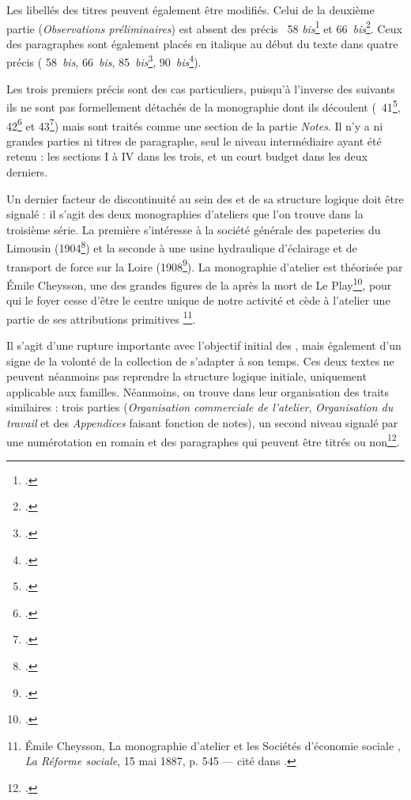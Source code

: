 Les libellés des titres peuvent également être modifiés. Celui de la deuxième partie (\textit{Observations préliminaires}) est absent des précis \no{}~58 \textit{bis}\footcite[p. 153]{mono058b} et 66~\textit{bis}\footcite[p. 125]{mono066b}. Ceux des paragraphes sont également placés en italique au début du texte dans quatre précis (\no{} 58~\textit{bis}, 66~\textit{bis}, 85~\textit{bis}\footcite{mono085b}, 90~\textit{bis}\footcite{mono090b}).

Les trois premiers précis sont des cas particuliers, puisqu'à l'inverse des suivants ils ne sont pas formellement détachés de la monographie dont ils découlent (\no{}~41\footcite[p. 188-196]{mono041a}, 42\footcite[246-258]{mono042a} et 43\footcite[p. 300-305]{mono043a}) mais sont traités comme une section de la partie \textit{Notes}. Il n'y a ni grandes parties ni titres de paragraphe, seul le niveau intermédiaire ayant été retenu : les sections I à IV dans les trois, et un court budget dans les deux derniers.

Un dernier facteur de discontinuité au sein des \odm{} et de sa structure logique doit être signalé : il s'agit des deux monographies d'ateliers que l'on trouve dans la troisième série. La première s'intéresse à la société générale des papeteries du Limousin (1904\footcite{mono472a}) et la seconde à  une usine hydraulique d’éclairage et de transport de force sur la Loire (1908\footcite{mono473a}). La monographie d'atelier est théorisée par Émile Cheysson, une des grandes figures de la \sess après la mort de Le Play\footcite[p. 336-337]{savoyecontinuateurs}, pour qui le \og foyer cesse d'être le centre unique de notre activité et cède à l'atelier une partie de ses attributions primitives \fg{}\footnote{Émile Cheysson, \og La monographie d'atelier et les Sociétés d'économie sociale \fg{}, \textit{La Réforme sociale}, 15 mai 1887, p. 545 --- cité dans \cite[p. 23]{savoye2}.}.

Il s'agit d'une rupture importante avec l'objectif initial des \odm, mais également d'un signe de la volonté de la collection de s'adapter à son temps. Ces deux textes ne peuvent néanmoins pas reprendre la structure logique initiale, uniquement applicable aux familles. Néanmoins, on trouve dans leur organisation des traits similaires : trois parties (\textit{Organisation commerciale de l'atelier}, \textit{Organisation du travail} et des \textit{Appendices} faisant fonction de notes), un second niveau signalé par une numérotation en romain et des paragraphes qui peuvent être titrés ou non\footcite[p. 337]{savoyecontinuateurs}.

